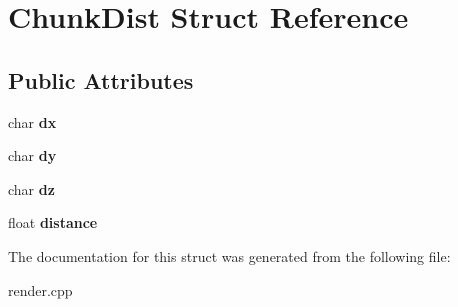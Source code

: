 \hypertarget{structChunkDist}{\section{\-Chunk\-Dist \-Struct \-Reference}
\label{structChunkDist}
}
\subsection*{\-Public \-Attributes}
\begin{DoxyCompactItemize}
\item 
\hypertarget{structChunkDist_a7deb5c6e44b43c57ec1eb5d72ddcd1d1}{char {\bfseries dx}}\label{structChunkDist_a7deb5c6e44b43c57ec1eb5d72ddcd1d1}

\item 
\hypertarget{structChunkDist_a7ba7baed72b9432e69f7e246ee02dc9a}{char {\bfseries dy}}\label{structChunkDist_a7ba7baed72b9432e69f7e246ee02dc9a}

\item 
\hypertarget{structChunkDist_a3ab9ab3f997301327e33e9f94b830dde}{char {\bfseries dz}}\label{structChunkDist_a3ab9ab3f997301327e33e9f94b830dde}

\item 
\hypertarget{structChunkDist_aa15f7a59481270053d92b8c20e26b2fe}{float {\bfseries distance}}\label{structChunkDist_aa15f7a59481270053d92b8c20e26b2fe}

\end{DoxyCompactItemize}


\-The documentation for this struct was generated from the following file\-:\begin{DoxyCompactItemize}
\item 
render.\-cpp\end{DoxyCompactItemize}
